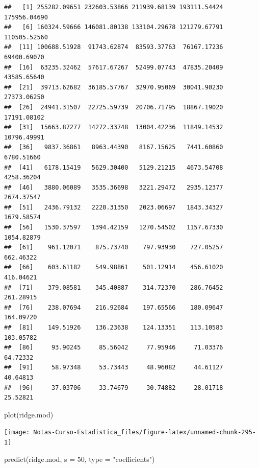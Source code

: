 \documentclass[
  12pt,
]{book}
\newenvironment{Shaded}{\begin{snugshade}}{\end{snugshade}}
\newcommand{\AttributeTok}[1]{\textcolor[rgb]{0.77,0.63,0.00}{#1}}
\newcommand{\DecValTok}[1]{\textcolor[rgb]{0.00,0.00,0.81}{#1}}
\newcommand{\FunctionTok}[1]{\textcolor[rgb]{0.00,0.00,0.00}{#1}}
\newcommand{\NormalTok}[1]{#1}
\newcommand{\StringTok}[1]{\textcolor[rgb]{0.31,0.60,0.02}{#1}}
\theoremstyle{definition}
\theoremstyle{definition}
\theoremstyle{definition}
\theoremstyle{remark}
\begin{document}
\begin{verbatim}
##   [1] 255282.09651 232603.53866 211939.68139 193111.54424 175956.04690
##   [6] 160324.59666 146081.80138 133104.29678 121279.67791 110505.52560
##  [11] 100688.51928  91743.62874  83593.37763  76167.17236  69400.69070
##  [16]  63235.32462  57617.67267  52499.07743  47835.20409  43585.65640
##  [21]  39713.62682  36185.57767  32970.95069  30041.90230  27373.06250
##  [26]  24941.31507  22725.59739  20706.71795  18867.19020  17191.08102
##  [31]  15663.87277  14272.33748  13004.42236  11849.14532  10796.49991
##  [36]   9837.36861   8963.44390   8167.15625   7441.60860   6780.51660
##  [41]   6178.15419   5629.30400   5129.21215   4673.54708   4258.36204
##  [46]   3880.06089   3535.36698   3221.29472   2935.12377   2674.37547
##  [51]   2436.79132   2220.31350   2023.06697   1843.34327   1679.58574
##  [56]   1530.37597   1394.42159   1270.54502   1157.67330   1054.82879
##  [61]    961.12071    875.73740    797.93930    727.05257    662.46322
##  [66]    603.61182    549.98861    501.12914    456.61020    416.04621
##  [71]    379.08581    345.40887    314.72370    286.76452    261.28915
##  [76]    238.07694    216.92684    197.65566    180.09647    164.09720
##  [81]    149.51926    136.23638    124.13351    113.10583    103.05782
##  [86]     93.90245     85.56042     77.95946     71.03376     64.72332
##  [91]     58.97348     53.73443     48.96082     44.61127     40.64813
##  [96]     37.03706     33.74679     30.74882     28.01718     25.52821
\end{verbatim}

\begin{Shaded}
\begin{Highlighting}[]
\FunctionTok{plot}\NormalTok{(ridge.mod)}
\end{Highlighting}
\end{Shaded}

\begin{center}\texttt{[image: Notas-Curso-Estadistica\_files/figure-latex/unnamed-chunk-295-1]} \end{center}

\begin{Shaded}
\begin{Highlighting}[]
\FunctionTok{predict}\NormalTok{(ridge.mod, }\AttributeTok{s =} \DecValTok{50}\NormalTok{, }\AttributeTok{type =} \StringTok{"coefficients"}\NormalTok{)}
\end{Highlighting}
\end{Shaded}
\end{document}
